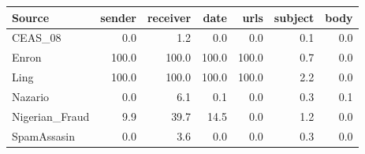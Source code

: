 \begin{tabular}{lrrrrrr}
\toprule
Source & sender & receiver & date & urls & subject & body \\
\midrule
CEAS\_08 & 0.0 & 1.2 & 0.0 & 0.0 & 0.1 & 0.0 \\
Enron & 100.0 & 100.0 & 100.0 & 100.0 & 0.7 & 0.0 \\
Ling & 100.0 & 100.0 & 100.0 & 100.0 & 2.2 & 0.0 \\
Nazario & 0.0 & 6.1 & 0.1 & 0.0 & 0.3 & 0.1 \\
Nigerian\_Fraud & 9.9 & 39.7 & 14.5 & 0.0 & 1.2 & 0.0 \\
SpamAssasin & 0.0 & 3.6 & 0.0 & 0.0 & 0.3 & 0.0 \\
\bottomrule
\end{tabular}